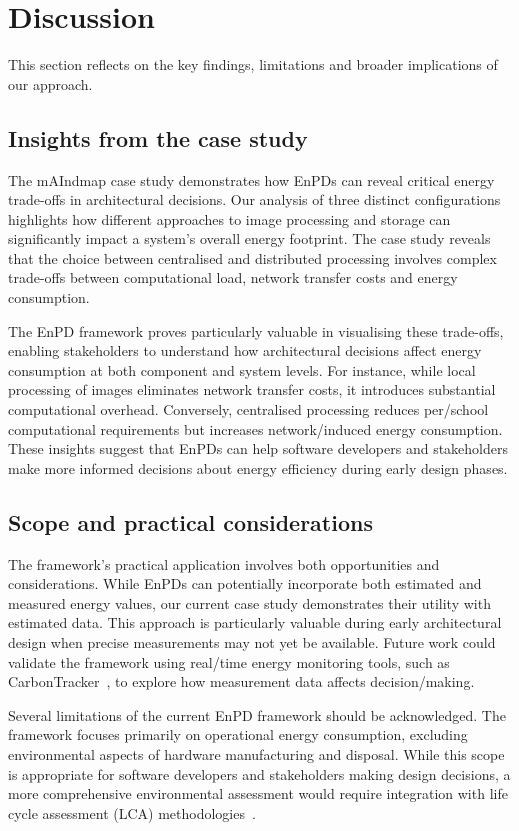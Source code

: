 \section{Discussion}
This section reflects on the key findings, limitations and broader implications of our approach.

\subsection{Insights from the case study}
The mAIndmap case study demonstrates how EnPDs can reveal critical energy trade-offs in architectural decisions.
Our analysis of three distinct configurations highlights how different approaches to image processing and storage can significantly impact a system's overall energy footprint.
The case study reveals that the choice between centralised and distributed processing involves complex trade-offs between computational load, network transfer costs and energy consumption.

The EnPD framework proves particularly valuable in visualising these trade-offs, enabling stakeholders to understand how architectural decisions affect energy consumption at both component and system levels.
For instance, while local processing of images eliminates network transfer costs, it introduces substantial computational overhead.
Conversely, centralised processing reduces per\-/school computational requirements but increases network\-/induced energy consumption.
These insights suggest that EnPDs can help software developers and stakeholders make more informed decisions about energy efficiency during early design phases.

\subsection{Scope and practical considerations}
The framework's practical application involves both opportunities and considerations.
While EnPDs can potentially incorporate both estimated and measured energy values, our current case study demonstrates their utility with estimated data.
This approach is particularly valuable during early architectural design when precise measurements may not yet be available.
Future work could validate the framework using real\-/time energy monitoring tools, such as CarbonTracker~\cite{anthony2020carbontracker}, to explore how measurement data affects decision\-/making.

Several limitations of the current EnPD framework should be acknowledged.
The framework focuses primarily on operational energy consumption, excluding environmental aspects of hardware manufacturing and disposal.
While this scope is appropriate for software developers and stakeholders making design decisions, a more comprehensive environmental assessment would require integration with life cycle assessment (LCA) methodologies~\cite{guinee2018digesting}.

